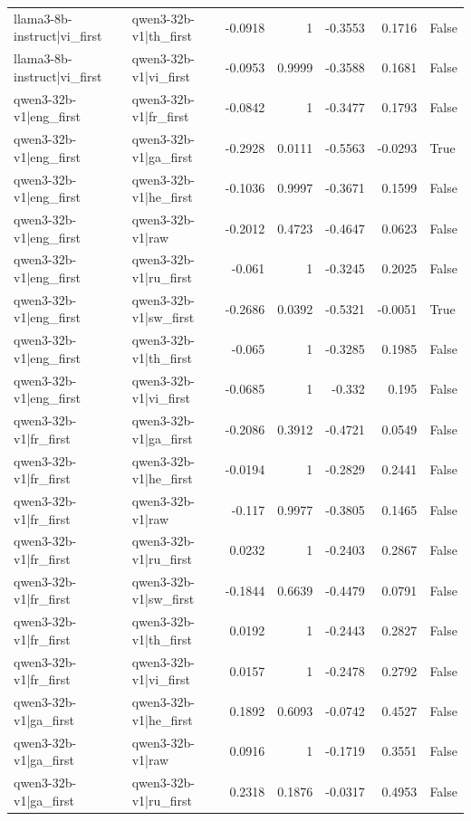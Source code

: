 \begin{table}
\begin{tabular}{l l r r r r l}
llama3-8b-instruct|vi_first & qwen3-32b-v1|th_first & -0.0918 & 1 & -0.3553 & 0.1716 & False \\
llama3-8b-instruct|vi_first & qwen3-32b-v1|vi_first & -0.0953 & 0.9999 & -0.3588 & 0.1681 & False \\
qwen3-32b-v1|eng_first & qwen3-32b-v1|fr_first & -0.0842 & 1 & -0.3477 & 0.1793 & False \\
qwen3-32b-v1|eng_first & qwen3-32b-v1|ga_first & -0.2928 & 0.0111 & -0.5563 & -0.0293 & True \\
qwen3-32b-v1|eng_first & qwen3-32b-v1|he_first & -0.1036 & 0.9997 & -0.3671 & 0.1599 & False \\
qwen3-32b-v1|eng_first & qwen3-32b-v1|raw & -0.2012 & 0.4723 & -0.4647 & 0.0623 & False \\
qwen3-32b-v1|eng_first & qwen3-32b-v1|ru_first & -0.061 & 1 & -0.3245 & 0.2025 & False \\
qwen3-32b-v1|eng_first & qwen3-32b-v1|sw_first & -0.2686 & 0.0392 & -0.5321 & -0.0051 & True \\
qwen3-32b-v1|eng_first & qwen3-32b-v1|th_first & -0.065 & 1 & -0.3285 & 0.1985 & False \\
qwen3-32b-v1|eng_first & qwen3-32b-v1|vi_first & -0.0685 & 1 & -0.332 & 0.195 & False \\
qwen3-32b-v1|fr_first & qwen3-32b-v1|ga_first & -0.2086 & 0.3912 & -0.4721 & 0.0549 & False \\
qwen3-32b-v1|fr_first & qwen3-32b-v1|he_first & -0.0194 & 1 & -0.2829 & 0.2441 & False \\
qwen3-32b-v1|fr_first & qwen3-32b-v1|raw & -0.117 & 0.9977 & -0.3805 & 0.1465 & False \\
qwen3-32b-v1|fr_first & qwen3-32b-v1|ru_first & 0.0232 & 1 & -0.2403 & 0.2867 & False \\
qwen3-32b-v1|fr_first & qwen3-32b-v1|sw_first & -0.1844 & 0.6639 & -0.4479 & 0.0791 & False \\
qwen3-32b-v1|fr_first & qwen3-32b-v1|th_first & 0.0192 & 1 & -0.2443 & 0.2827 & False \\
qwen3-32b-v1|fr_first & qwen3-32b-v1|vi_first & 0.0157 & 1 & -0.2478 & 0.2792 & False \\
qwen3-32b-v1|ga_first & qwen3-32b-v1|he_first & 0.1892 & 0.6093 & -0.0742 & 0.4527 & False \\
qwen3-32b-v1|ga_first & qwen3-32b-v1|raw & 0.0916 & 1 & -0.1719 & 0.3551 & False \\
qwen3-32b-v1|ga_first & qwen3-32b-v1|ru_first & 0.2318 & 0.1876 & -0.0317 & 0.4953 & False \\

\end{tabular}
\end{table}
